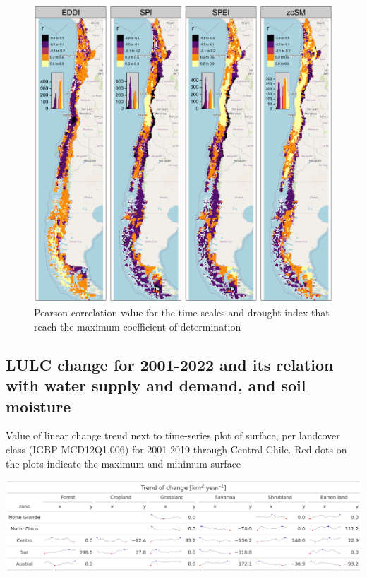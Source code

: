 \documentclass[
  number,
  preprint,
  3p,
  onecolumn]{elsarticle}
\begin{document}
\begin{figure}[!ht]

{\centering \includegraphics{../output/figs/mapa_cor_r_indices_zcNDVI6.png}

}

\caption{\label{fig-corPerson}Pearson correlation value for the time
scales and drought index that reach the maximum coefficient of
determination}

\end{figure}

\hypertarget{lulc-change-for-2001-2022-and-its-relation-with-water-supply-and-demand-and-soil-moisture}{%
\subsection{LULC change for 2001-2022 and its relation with water supply
and demand, and soil
moisture}\label{lulc-change-for-2001-2022-and-its-relation-with-water-supply-and-demand-and-soil-moisture}}

\begin{table}[!ht]
\label{tab-landcoverTrend}
\caption{Value of linear change trend next to time-series plot of surface, per landcover class (IGBP MCD12Q1.006) for 2001-2019 through Central Chile. Red dots on the plots indicate the maximum and minimum surface}
\includegraphics[]{../output/figs/table_var_landcover_macro.png}
\end{table}
\end{document}
